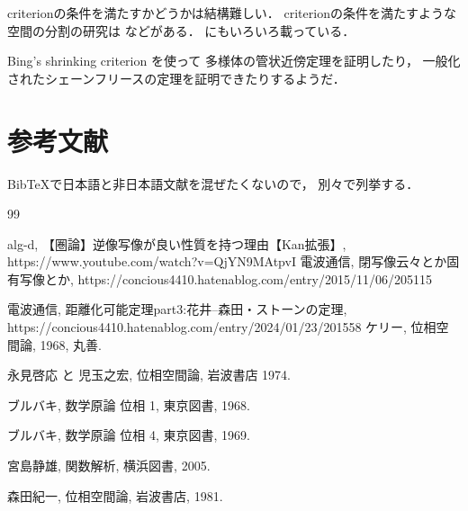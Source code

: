 \documentclass[leqno, a4paper, 12pt]{jsarticle}
\numberwithin{equation}{section}
\begin{document}
criterionの条件を満たすかどうかは結構難しい．
criterionの条件を満たすような空間の分割の研究は
 \cite{zbMATH01307859}
 などがある．
 \cite{arXiv:2103.02977}
 にもいろいろ載っている．
 
 Bing's shrinking criterion
 を使って
多様体の管状近傍定理を証明したり\cite{arXiv:2103.02977}，
一般化されたシェーンフリースの定理を証明できたりするようだ\cite[Theorem 2.7.7]{MR4179591}．

 

\section{参考文献}
BibTeXで日本語と非日本語文献を混ぜたくないので，
別々で列挙する．



{\renewcommand{\refname}{日本語の参考文献}   
\begin{thebibliography}{99}

alg-d, 
【圏論】逆像写像が良い性質を持つ理由【Kan拡張】, 
https://www.youtube.com/watch?v=QjYN9MAtpvI
電波通信, 
閉写像云々とか固有写像とか, 
https://concious4410.hatenablog.com/entry/2015/11/06/205115

電波通信, 
距離化可能定理part3:花井--森田・ストーンの定理, 
https://concious4410.hatenablog.com/entry/2024/01/23/201558
ケリー, 
位相空間論, 
1968, 
丸善. 

永見啓応
と
児玉之宏, 
位相空間論,
岩波書店 
1974. 

ブルバキ, 
数学原論 位相 1, 
東京図書, 
1968. 

ブルバキ, 
数学原論 位相 4, 
東京図書, 
1969. 


宮島静雄, 
関数解析, 
横浜図書, 
2005. 

森田紀一, 
位相空間論, 
岩波書店, 
1981.



\end{thebibliography}
}



{\renewcommand{\refname}{日本語以外の参考文献}   


}
\end{document}
